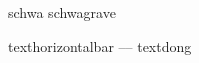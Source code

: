 \stopencoding




\ifx\zdot\undefined \def\zdot{\zdotaccent} \fi
\ifx\Zdot\undefined \def\Zdot{\Zdotaccent} \fi

\ifx\greeklamda\undefined \def\greeklamda{\greeklambda} \fi
\ifx\greekLamda\undefined \def\greekLamda{\greekLambda} \fi

\ifx\leftguillemet \undefined \def\leftguillemet {\leftguillemot } \fi
\ifx\rightguillemet\undefined \def\rightguillemet{\rightguillemot} \fi


\startencoding[\s!default]

 schwa      {\hbox{}}
 schwagrave {\buildtextgrave\schwa}

\stopencoding


\startencoding[\s!default]

 texthorizontalbar {{--\kern\zeropoint--}}
 textdong          {\underbar{\dstroke}}

\stopencoding

\endinput
